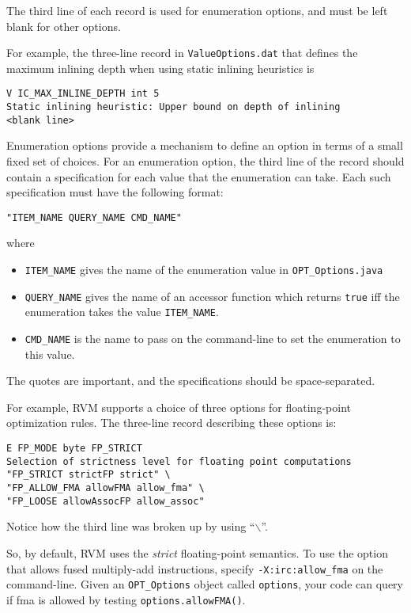 The third line of each record is used for enumeration options, and must
be left blank for other options.

For example, the three-line record in {\tt ValueOptions.dat}
that defines the maximum inlining depth when using static inlining
heuristics is
\begin{verbatim}
V IC_MAX_INLINE_DEPTH int 5
Static inlining heuristic: Upper bound on depth of inlining
<blank line>
\end{verbatim}

Enumeration options provide a mechanism to define an option in terms of 
a small fixed set of choices.  For an enumeration option, the third line
of the record should contain a specification for each value that the
enumeration can take.  Each such specification must have the following
format:
\begin{verbatim}
"ITEM_NAME QUERY_NAME CMD_NAME"
\end{verbatim}
where
\begin{itemize}
\item {\tt ITEM\_NAME} gives the name of the enumeration value in {\tt OPT\_Options.java}
\item {\tt QUERY\_NAME} gives the name of an accessor function which returns {\tt true} iff the enumeration takes the value {\tt ITEM\_NAME}.
\item {\tt CMD\_NAME} is the name to pass on the command-line to set the enumeration to this value.
\end{itemize}
The quotes are important, and the specifications should be
space-separated.

For example, RVM supports a choice of three options for floating-point
optimization rules.  The three-line record describing these options is:
\begin{verbatim}
E FP_MODE byte FP_STRICT
Selection of strictness level for floating point computations
"FP_STRICT strictFP strict" \
"FP_ALLOW_FMA allowFMA allow_fma" \
"FP_LOOSE allowAssocFP allow_assoc"
\end{verbatim}
Notice how the third line was broken up by using ``$\backslash$''.

So, by default, RVM uses the {\em strict} floating-point semantics.  To use
the option that allows fused multiply-add instructions, 
specify {\tt -X:irc:allow\_fma} on the command-line.
Given an {\tt OPT\_Options} object called {\tt options}, your code can
query if fma is allowed by testing {\tt options.allowFMA()}.

